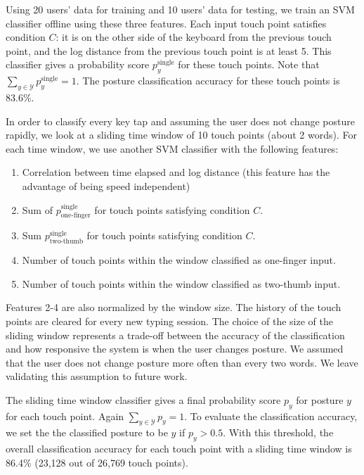 \documentclass{sigchi}
\begin{document}
Using 20 users’ data for training and 10 users’ data for testing, we train an SVM classifier offline using these three features.  Each input touch point satisfies condition $C$: it is
on the other side of the keyboard from the previous touch point, and the log distance from the previous touch point is at least 5. This classifier gives a probability score $p_y^{\text{single}}$ for these touch points. Note that $\displaystyle\sum_{y \in \mathcal{Y}}p_y^{\text{single}} = 1$. The posture classification accuracy for these touch points is 83.6\%.

In order to classify every key tap and assuming the user does not change posture
rapidly, we look at a sliding time window of 10 touch points (about 2 words). For
each time window, we use another SVM classifier with the following features:
\begin{enumerate}
\item Correlation between time elapsed and log distance (this feature has the
advantage of being speed independent)
\item Sum of $p_\text{one-finger}^{\text{single}}$ for touch points satisfying condition $C$.
\item Sum $p_\text{two-thumb}^{\text{single}}$ for touch points satisfying condition $C$.
\item Number of touch points within the window classified as one-finger input.
\item Number of touch points within the window classified as two-thumb input.
\end{enumerate}
Features 2-4 are also normalized by the window size. The history of the touch points are cleared for every new typing session.
The choice of the size of the sliding window represents a trade-off between the
accuracy of the classification and how responsive the system is when the user
changes posture. We assumed that the user does not change posture
more often than every two words.  We leave validating this assumption to future work.

The sliding time window classifier gives a final probability score $p_y$ for posture
$y$ for each touch point. Again $\displaystyle\sum_{y\in \mathcal{Y}}p_y = 1$. To evaluate the classification accuracy, we set the the
classified posture to be $y$ if $p_y > 0.5$. With this threshold, the overall classification
accuracy for each touch point with a sliding time window
is 86.4\% (23,128 out of 26,769 touch points).
\end{document}
